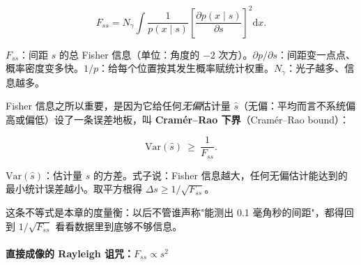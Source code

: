 \begin{equation}
  F_{ss}=N_\gamma\int
  \frac{1}{p(x\mid s)}
  \left[\frac{\partial p(x\mid s)}{\partial s}\right]^{2}\mathrm{d}x.
  \label{eq:e12-fisher-def}
\end{equation}
\begin{formulaexplain}
\(F_{ss}\)：间距 \(s\) 的总 Fisher 信息（单位：角度的 \(-2\) 次方）。\(\partial p/\partial s\)：间距变一点点、概率密度变多快。\(1/p\)：给每个位置按其发生概率赋统计权重。\(N_\gamma\)：光子越多、信息越多。
\end{formulaexplain}

Fisher 信息之所以重要，是因为它给任何\emph{无偏}估计量 \(\hat s\)（无偏：平均而言不系统偏高或偏低）设了一条误差地板，叫 \textbf{Cramér--Rao 下界}（Cramér--Rao bound）：

\begin{equation}
  \mathrm{Var}(\hat s)\ \ge\ \frac{1}{F_{ss}}.
  \label{eq:e12-crb}
\end{equation}
\begin{formulaexplain}
\(\mathrm{Var}(\hat s)\)：估计量 \(\hat s\) 的方差。式子说：Fisher 信息越大，任何无偏估计能达到的最小统计误差越小。取平方根得 \(\Delta s\ge 1/\sqrt{F_{ss}}\)。
\end{formulaexplain}

这条不等式是本章的度量衡：以后不管谁声称"能测出 0.1 毫角秒的间距"，都得回到 \(1/\sqrt{F_{ss}}\) 看看数据里到底够不够信息。

\paragraph{直接成像的 Rayleigh 诅咒：\texorpdfstring{$F_{ss}\propto s^{2}$}{Fss 正比于 s 平方}}
\label{sec:e12-curse}

